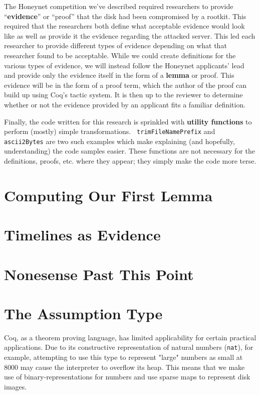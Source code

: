 \documentclass[nocopyrightspace]{sigplanconf}
\begin{document}
The Honeynet competition we've described required researchers to provide
``{\bf evidence}'' or ``proof'' that the disk had been compromised by a
rootkit. This required that the researchers both define what acceptable
evidence would look like as well as provide it the evidence regarding the
attacked server. This led each researcher to provide different types of
evidence depending on what that researcher found to be acceptable. While we
could create definitions for the various types of evidence, we will instead
follow the Honeynet applicants' lead and provide only the evidence itself in
the form of a {\bf lemma} or proof. This evidence will be in the form of a
proof term, which the author of the proof can build up using Coq's tactic
system. It is then up to the reviewer to determine whether or not the evidence
provided by an applicant fits a familiar definition.

Finally, the code written for this research is sprinkled with {\bf utility
functions} to perform (mostly) simple transformations. {\tt
trimFileNamePrefix} and {\tt ascii2Bytes} are two such examples which make
explaining (and hopefully, understanding) the code samples easier. These
functions are not necessary for the definitions, proofs, etc. where they
appear; they simply make the code more terse.

\section{Computing Our First Lemma}

\section{Timelines as Evidence}

\section{Nonesense Past This Point}

\section{The Assumption Type}

Coq, as a theorem proving language, has limited applicability for certain
practical applications. Due to its constructive representation of natural
numbers ({\tt nat}), for example, attempting to use this type to represent
"large" numbers as small at 8000 may cause the interpreter to overflow its
heap. This means that we make use of binary-representations for numbers and
use sparse maps to represent disk images. 
\end{document}
